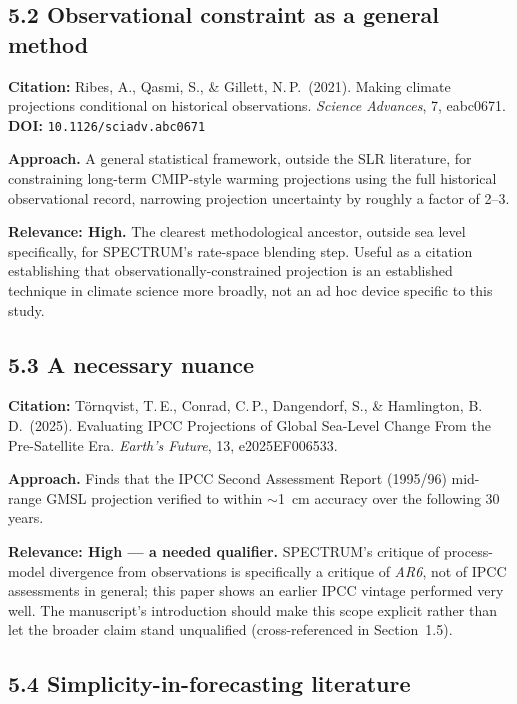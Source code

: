 \documentclass[11pt]{article}
\begin{document}
\subsection*{5.2 Observational constraint as a general method}

\noindent\textbf{Citation:} Ribes, A., Qasmi, S., \& Gillett, N.\,P.\
(2021). Making climate projections conditional on historical observations.
\textit{Science Advances}, 7, eabc0671.\\
\textbf{DOI:} \texttt{10.1126/sciadv.abc0671}

\noindent\textbf{Approach.} A general statistical framework, outside the SLR
literature, for constraining long-term CMIP-style warming projections using
the full historical observational record, narrowing projection uncertainty
by roughly a factor of 2--3.

\noindent\textbf{Relevance: High.} The clearest methodological ancestor,
outside sea level specifically, for SPECTRUM's rate-space blending step.
Useful as a citation establishing that observationally-constrained
projection is an established technique in climate science more broadly, not
an ad hoc device specific to this study.

\subsection*{5.3 A necessary nuance}

\noindent\textbf{Citation:} Törnqvist, T.\,E., Conrad, C.\,P.,
Dangendorf, S., \& Hamlington, B.\,D.\ (2025). Evaluating IPCC Projections
of Global Sea-Level Change From the Pre-Satellite Era. \textit{Earth's
Future}, 13, e2025EF006533.

\noindent\textbf{Approach.} Finds that the IPCC Second Assessment Report
(1995/96) mid-range GMSL projection verified to within $\sim$1~cm accuracy
over the following 30 years.

\noindent\textbf{Relevance: High --- a needed qualifier.} SPECTRUM's
critique of process-model divergence from observations is specifically a
critique of \emph{AR6}, not of IPCC assessments in general; this paper
shows an earlier IPCC vintage performed very well. The manuscript's
introduction should make this scope explicit rather than let the broader
claim stand unqualified (cross-referenced in Section~1.5).

\subsection*{5.4 Simplicity-in-forecasting literature}
\end{document}
